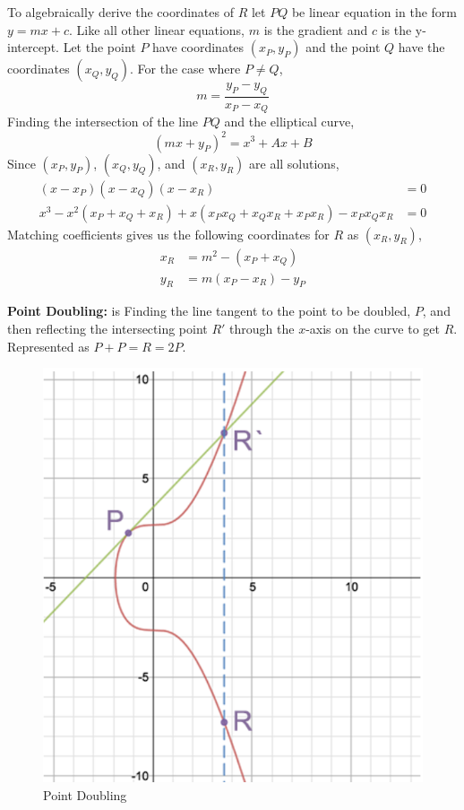 \documentclass[a4paper,12pt]{article}
\theoremstyle{definition}
\begin{document}
To algebraically derive the coordinates of $R$ let  $PQ$ be linear equation in the form $y=mx+c$. Like all other linear equations, $m$ is the gradient and $c$ is the y-intercept. Let the point $P$ have coordinates $(x_P,y_P)$ and the point $Q$ have the coordinates $(x_Q,y_Q)$. For the case where $P \neq Q$,
\begin{equation}
	m = \frac{y_P - y_Q}{x_P - x_Q}
\end{equation}
\indent Finding the intersection of the line $PQ$ and the elliptical curve,
\begin{equation}
	(mx+y_P)^2=x^3+Ax+B
\end{equation}
\indent Since $(x_P,y_P)$, $(x_Q,y_Q)$, and $(x_R,y_R)$ are all solutions,
\begin{equation}
	\begin{split}
		(x-x_P)(x-x_Q)(x-x_R) &= 0 \\
		x^3 - x^2(x_P + x_Q + x_R) + x(x_Px_Q+x_Qx_R+x_Px_R)-x_Px_Qx_R &= 0
	\end{split}
\end{equation}
\indent Matching coefficients gives us the following coordinates for $R$ as $(x_R,y_R)$,
\begin{equation}
	\begin{split}
		x_R&=m^2-(x_P+x_Q)\\
		y_R&=m(x_P-x_R)-y_P
	\end{split}
\end{equation}


\textbf{Point Doubling:} is Finding the line tangent to the point to be doubled, $P$, and then reflecting the intersecting point $R'$ through the $x$-axis on the curve to get $R$. Represented as $P + P = R = 2P$.
\begin{figure}[!htb]
     \centering
     \includegraphics[width=.5\linewidth]{pointdoubling}
     \caption{Point Doubling}
     \label{}
\end{figure} 
\end{document}
